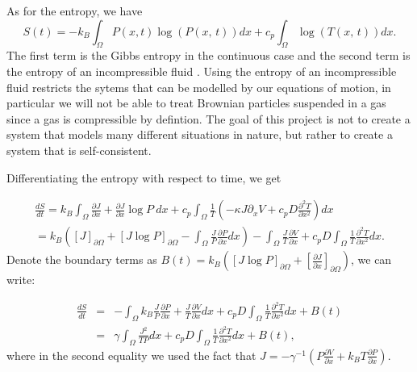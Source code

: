 As for the entropy, we have \cite{Streater1997a}
\begin{equation}
S(t) = -k_B \int_{\Omega} P(x, t) \log(P(x, \, t)) dx + c_p \int_{\Omega} \log(T(x, \, t)) dx.
\end{equation}
The first term is the Gibbs entropy in the continuous case \cite{Jaynes1965} and the second term is the entropy of an incompressible fluid \cite{CengelBoles1994}. Using the entropy of an incompressible fluid restricts the sytems that can be modelled by our equations of motion, in particular we will not be able to treat Brownian particles suspended in a gas since a gas is compressible by defintion. The goal of this project is not to create a system that models many different situations in nature, but rather to create a system that is self-consistent.

Differentiating the entropy with respect to time, we get

\begin{align}
\frac{d S}{d t} =  k_B \int_{\Omega} \frac{\partial J}{\partial x} + \frac{\partial J}{\partial x} \log P \ dx + c_p \int_{\Omega} \frac{1}{T} \left(-\kappa J \partial_x V + c_p D \frac{\partial^2 T}{\partial x^2} \right) dx \\
                     = k_B \left ( [J]_{\partial \Omega} + [J \log P]_{\partial \Omega} - \int_{\Omega} \frac{J}{P} \frac{\partial P}{\partial x} dx \right) - \int_{\Omega} \frac{J}{T} \frac{\partial V}{\partial x} + c_p D \int_{\Omega} \frac{1}{T} \frac{\partial^2 T}{\partial x^2} dx.
\end{align}
Denote the boundary terms as $B(t) = k_B( [J \log P]_{\partial \Omega} + \left[\frac{\partial J}{\partial x} \right]_{\partial \Omega} ) $, we can write:

\begin{eqnarray}
\frac{d S}{d t} & = & - \int_{\Omega} k_B \frac{J}{P} \frac{\partial P}{\partial x} + \frac{J}{T} \frac{\partial V}{\partial x} dx +  c_p D \int_{\Omega} \frac{1}{T} \frac{\partial^2 T}{\partial x^2} dx + B(t) \\
                    & = & \gamma \int_{\Omega} \frac{J^2}{T P} dx + c_p D \int_{\Omega} \frac{1}{T} \frac{\partial^2 T}{\partial x^2} dx + B(t), \label{eqn:entropyGen}
\end{eqnarray}
where in the second equality we used the fact that $J = -\gamma^{-1} ( P \frac{\partial V}{\partial x} + k_B T \frac{\partial P}{\partial x})$.

